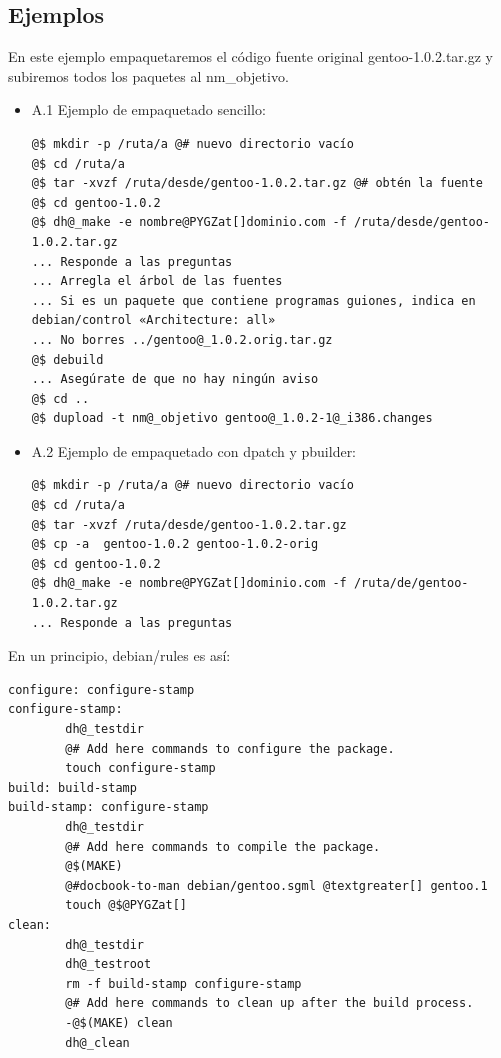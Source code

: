 \documentclass[letterpaper,12pt,spanish]{manual}
\begin{document}
\subsection{Ejemplos}

En este ejemplo empaquetaremos el código fuente original gentoo-1.0.2.tar.gz y subiremos todos los paquetes al nm\_objetivo.
\begin{itemize}
\item {} 
A.1 Ejemplo de empaquetado sencillo:

\begin{Verbatim}[commandchars=@\[\]]
@$ mkdir -p /ruta/a @# nuevo directorio vacío
@$ cd /ruta/a
@$ tar -xvzf /ruta/desde/gentoo-1.0.2.tar.gz @# obtén la fuente
@$ cd gentoo-1.0.2
@$ dh@_make -e nombre@PYGZat[]dominio.com -f /ruta/desde/gentoo-1.0.2.tar.gz
... Responde a las preguntas
... Arregla el árbol de las fuentes
... Si es un paquete que contiene programas guiones, indica en debian/control «Architecture: all»
... No borres ../gentoo@_1.0.2.orig.tar.gz
@$ debuild
... Asegúrate de que no hay ningún aviso
@$ cd ..
@$ dupload -t nm@_objetivo gentoo@_1.0.2-1@_i386.changes
\end{Verbatim}

\item {} 
A.2 Ejemplo de empaquetado con dpatch y pbuilder:

\begin{Verbatim}[commandchars=@\[\]]
@$ mkdir -p /ruta/a @# nuevo directorio vacío
@$ cd /ruta/a
@$ tar -xvzf /ruta/desde/gentoo-1.0.2.tar.gz
@$ cp -a  gentoo-1.0.2 gentoo-1.0.2-orig
@$ cd gentoo-1.0.2
@$ dh@_make -e nombre@PYGZat[]dominio.com -f /ruta/de/gentoo-1.0.2.tar.gz
... Responde a las preguntas
\end{Verbatim}

\end{itemize}

En un principio, debian/rules es así:

\begin{Verbatim}[commandchars=@\[\]]
configure: configure-stamp
configure-stamp:
        dh@_testdir
        @# Add here commands to configure the package.
        touch configure-stamp
build: build-stamp
build-stamp: configure-stamp
        dh@_testdir
        @# Add here commands to compile the package.
        @$(MAKE)
        @#docbook-to-man debian/gentoo.sgml @textgreater[] gentoo.1
        touch @$@PYGZat[]
clean:
        dh@_testdir
        dh@_testroot
        rm -f build-stamp configure-stamp
        @# Add here commands to clean up after the build process.
        -@$(MAKE) clean
        dh@_clean
\end{Verbatim}
\end{document}
